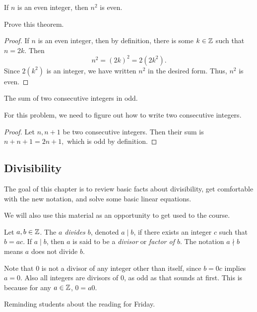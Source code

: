 \documentclass{ximera}
\begin{document}
 
\begin{thm}
If $n$ is an even integer, then $n^2$ is even.
\end{thm}
\begin{br}
 Prove this theorem.

\begin{proof}
 If $n$ is an even integer, then by definition, there is some $k\in\mathbb Z$ such that $n=2k$. Then \[n^2=(2k)^2=2(2k^2).\] Since $2(k^2)$ is an integer, we have written $n^2$ in the desired form. Thus, $n^2$ is even.
\end{proof}
\end{br}
 
 \begin{thm}
The sum of two consecutive integers in odd.
\end{thm}
For this problem, we need to figure out how to write two consecutive integers. 
\begin{proof}
 Let $n,n+1$ be two consecutive integers. Then their sum is $n+n+1=2n+1,$ which is odd by definition.
\end{proof}

\subsection{Divisibility}%

The goal of this chapter is to review basic facts about divisibility, get comfortable with the new notation, and solve some basic linear equations.

We will also use this material as an opportunity to get used to the course. 

\begin{defn}
 Let $a,b\in \mathbb Z$. The \emph{$a$ divides $b$}, denoted $a\mid b$,  if there exists an integer $c$ such that $b=ac$. If $a\mid b$, then $a$ is said to be a \emph{divisor} or \emph{factor of $b$}. The notation $a\nmid b$ means $a$ does not divide $b$.
\end{defn}

Note that 0 is not a divisor of any integer other than itself, since $b=0c$ implies $a=0$. Also all integers are divisors of 0, as odd as that sounds at first. This is because for any $a\in\mathbb Z$, $0=a0$. 


Reminding students about the reading for Friday.

\end{document}
